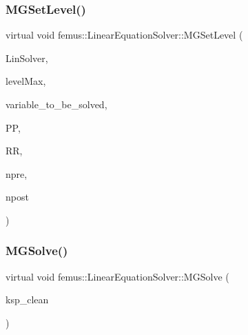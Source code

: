 \subsubsection{\texorpdfstring{M\+G\+Set\+Level()}{MGSetLevel()}}
{\footnotesize\ttfamily virtual void femus\+::\+Linear\+Equation\+Solver\+::\+M\+G\+Set\+Level (\begin{DoxyParamCaption}\item[{\mbox{\hyperlink{classfemus_1_1_linear_equation_solver}{Linear\+Equation\+Solver}} $\ast$}]{Lin\+Solver,  }\item[{const unsigned \&}]{level\+Max,  }\item[{const vector$<$ unsigned $>$ \&}]{variable\+\_\+to\+\_\+be\+\_\+solved,  }\item[{\mbox{\hyperlink{classfemus_1_1_sparse_matrix}{Sparse\+Matrix}} $\ast$}]{PP,  }\item[{\mbox{\hyperlink{classfemus_1_1_sparse_matrix}{Sparse\+Matrix}} $\ast$}]{RR,  }\item[{const unsigned \&}]{npre,  }\item[{const unsigned \&}]{npost }\end{DoxyParamCaption})\hspace{0.3cm}{\ttfamily [pure virtual]}}

\mbox{\label{classfemus_1_1_linear_equation_solver_a6233a9978c862c966e9f7b9b5ab6c95a}} 
\subsubsection{\texorpdfstring{M\+G\+Solve()}{MGSolve()}}
{\footnotesize\ttfamily virtual void femus\+::\+Linear\+Equation\+Solver\+::\+M\+G\+Solve (\begin{DoxyParamCaption}\item[{const bool}]{ksp\+\_\+clean }\end{DoxyParamCaption})\hspace{0.3cm}{\ttfamily [pure virtual]}}

\mbox{\label{classfemus_1_1_linear_equation_solver_a23b3ae3499f28474a3e97495ef711d65}} 
